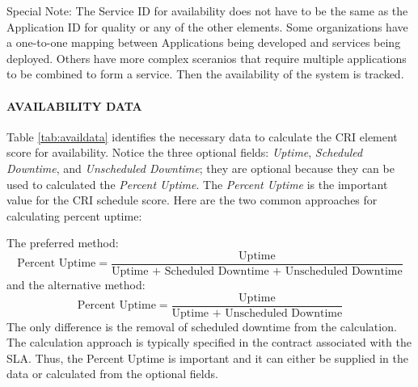 \documentclass[SDSUThesis.tex]{subfiles}
\begin{document}
            Special Note: The Service ID for availability does not have to be the same
            as the Application ID for quality or any of the other elements.  Some 
            organizations have a one-to-one mapping between Applications being developed
            and services being deployed.  Others have more complex sceranios that require
            multiple applications to be combined to form a service.  Then the availability
            of the system is tracked.
            
            \paragraph{AVAILABILITY DATA}
                Table \ref{tab:availdata} identifies the necessary data to calculate
                the CRI element score for availability.  Notice the three optional 
                fields: \textit{Uptime}, \textit{Scheduled Downtime}, and 
                \textit{Unscheduled Downtime}; they are optional because they can be
                used to calculated the \textit{Percent Uptime}.  The \textit{Percent Uptime}
                is the important value for the CRI schedule score.  Here are the two common
                approaches for calculating percent uptime:
                
                The preferred method:
                \[
                    \text{Percent Uptime} = \frac{\text{Uptime}}{\text{Uptime + Scheduled Downtime + Unscheduled Downtime}}
                \]
                and the alternative method:
                \[
                    \text{Percent Uptime} = \frac{\text{Uptime}}{\text{Uptime + Unscheduled Downtime}}
                \]
                The only difference is the removal of scheduled downtime from 
                the calculation.  The calculation approach is typically specified in
                the contract associated with the SLA.  Thus, the Percent Uptime is important
                and it can either be supplied in the data or calculated from the 
                optional fields.
            
\end{document}

